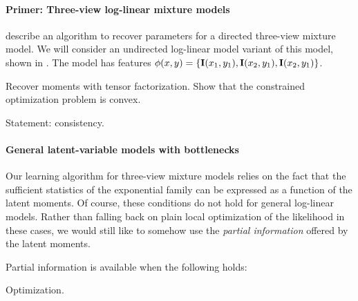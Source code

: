 \paragraph{Primer: Three-view log-linear mixture models}

\citet{anandkumar12moments} describe an algorithm to recover parameters
  for a directed three-view mixture model. 
We will consider an undirected log-linear model variant of this model,
  shown in .
The model has features $\phi(x,y) = \{\mathbf{I}(x_1,y_1), \mathbf{I}(x_2,y_1), \mathbf{I}(x_2,y_1)\}$.

Recover moments with tensor factorization.
Show that the constrained optimization problem is convex.

Statement: consistency.

\paragraph{General latent-variable models with bottlenecks}

Our learning algorithm for three-view mixture models relies on the fact that
the sufficient statistics of the exponential family
can be expressed as a function of the latent moments.
Of course, these conditions do not hold for general log-linear models.
Rather than falling back on plain local optimization of the likelihood in these
cases, we would still like
to somehow use the \emph{partial information} offered by the latent moments.

Partial information is available when the following holds:

Optimization.




